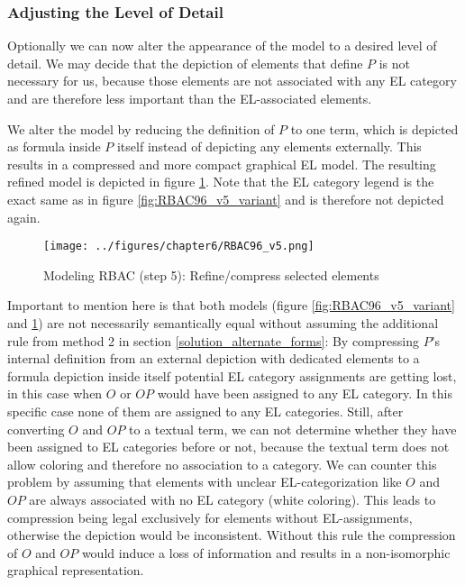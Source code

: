 \documentclass[twoside, openright, 12pt]{book}
\begin{document}
\subsubsection{Adjusting the Level of Detail}
\label{eval_lod}
Optionally we can now alter the appearance of the model to a desired level of detail.
We may decide that the depiction of elements that define $P$ is not necessary for us, because those elements are not associated with any EL category and are therefore less important than the EL-associated elements.

We alter the model by reducing the definition of $P$ to one term, which is depicted as formula inside $P$ itself instead of depicting any elements externally.
This results in a compressed and more compact graphical EL model.
The resulting refined model is depicted in figure \ref{fig:RBAC96_v5}.
Note that the EL category legend is the exact same as in figure \ref{fig:RBAC96_v5_variant} and is therefore not depicted again.

\begin{figure}[htb]
	\centering
	\texttt{[image: ../figures/chapter6/RBAC96\_v5.png]}
	\caption{Modeling RBAC (step 5): Refine/compress selected elements}
	\label{fig:RBAC96_v5}
\end{figure}

Important to mention here is that both models (figure \ref{fig:RBAC96_v5_variant} and \ref{fig:RBAC96_v5}) are not necessarily semantically equal without assuming the additional rule from method 2 in section \ref{solution_alternate_forms}: 
By compressing $P$'s internal definition from an external depiction with dedicated elements to a formula depiction inside itself potential EL category assignments are getting lost, in this case when $O$ or $\mathit{OP}$ would have been assigned to any EL category.
In this specific case none of them are assigned to any EL categories.
Still, after converting $O$ and $\mathit{OP}$ to a textual term, we can not determine whether they have been assigned to EL categories before or not, because the textual term does not allow coloring and therefore no association to a category.
We can counter this problem by assuming that elements with unclear EL-categorization like $O$ and $\mathit{OP}$ are always associated with no EL category (white coloring).
This leads to compression being legal exclusively for elements without EL-assignments, otherwise the depiction would be inconsistent.
Without this rule the compression of $O$ and $\mathit{OP}$ would induce a loss of information and results in a non-isomorphic graphical representation.
\end{document}
